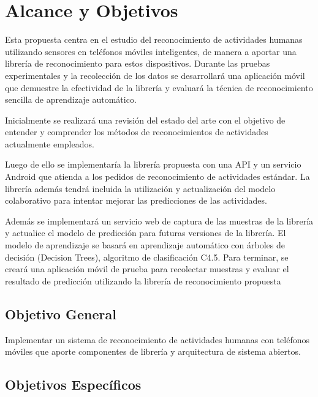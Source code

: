 \section{Alcance y Objetivos}

\label{alcance-y-objetivos}

Esta propuesta centra en el estudio del reconocimiento de actividades
humanas utilizando sensores en teléfonos móviles inteligentes, de
manera a aportar una librería de reconocimiento para estos dispositivos.
Durante las pruebas experimentales y la recolección de los datos se
desarrollará una aplicación móvil que demuestre la efectividad de
la librería y evaluará la técnica de reconocimiento sencilla de aprendizaje
automático.

Inicialmente se realizará una revisión del estado del arte con el
objetivo de entender y comprender los métodos de reconocimientos de
actividades actualmente empleados.

Luego de ello se implementaría la librería propuesta con una API y
un servicio Android que atienda a los pedidos de reconocimiento de
actividades estándar. La librería además tendrá incluida la utilización
y actualización del modelo colaborativo para intentar mejorar las
predicciones de las actividades.

Además se implementará un servicio web de captura de las muestras
de la librería y actualice el modelo de predicción para futuras versiones
de la librería. El modelo de aprendizaje se basará en aprendizaje
automático con árboles de decisión (Decision Trees), algoritmo de
clasificación C4.5. Para terminar, se creará una aplicación móvil
de prueba para recolectar muestras y evaluar el resultado de predicción
utilizando la librería de reconocimiento propuesta

\subsection{Objetivo General}

\label{objetivo-general}

Implementar un sistema de reconocimiento de actividades humanas con
teléfonos móviles que aporte componentes de librería y arquitectura
de sistema abiertos.

\subsection{Objetivos Específicos}

